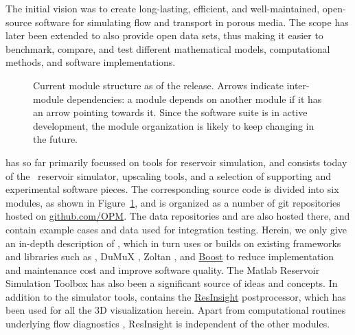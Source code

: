 The initial vision was to create long-lasting, efficient, and
well-maintained, open-source software for simulating flow and transport in porous
media. The scope has later been extended to also provide open data sets, thus
making it easier to benchmark, compare, and test different
mathematical models, computational methods, and software implementations.


\begin{figure}
  \center
  \scalebox{.85}{}
  \caption{Current module structure as of the \opmversion release.
    Arrows indicate inter-module dependencies: a module depends on
    another module if it has an arrow pointing towards it.
    Since the \opm software suite is in active development, the module
    organization is likely to keep changing in the future.}
  \label{fig:modules}
\end{figure}

\opm has so far primarily focussed on tools for reservoir simulation, and consists today
of the \opmflow\ reservoir simulator, upscaling tools, and a selection of supporting and
experimental software pieces. The corresponding source code is divided into six modules,
as shown in Figure~\ref{fig:modules}, and is organized as a number of git repositories
hosted on \url{github.com/OPM}. The data repositories \opmdata and \opmtests are also
hosted there, and contain example cases and data used for integration testing.
Herein, we only give an in-depth description of \opmflow,
which in turn uses or builds on existing frameworks and libraries such as
\href{http://www.dune-project.org}{\dune} \citep{dunepaperI:08}, DuMuX \citep{DuMuX},
Zoltan \citep{ZoltanIsorropiaOverview2012}, and \href{http://www.boost.org}{Boost} to
reduce implementation and maintenance cost and improve software quality.  The Matlab
Reservoir Simulation Toolbox \citep{MRST, MRST-AD, mrst-book} has also been a significant
source of ideas and concepts. In addition to the simulator tools, \opm contains the
\href{http://resinsight.org}{ResInsight} postprocessor, which has been used for all the 3D
visualization herein. Apart from computational routines underlying flow diagnostics
\cite{MKL14:diagnostics}, ResInsight is independent of the other \opm modules.


